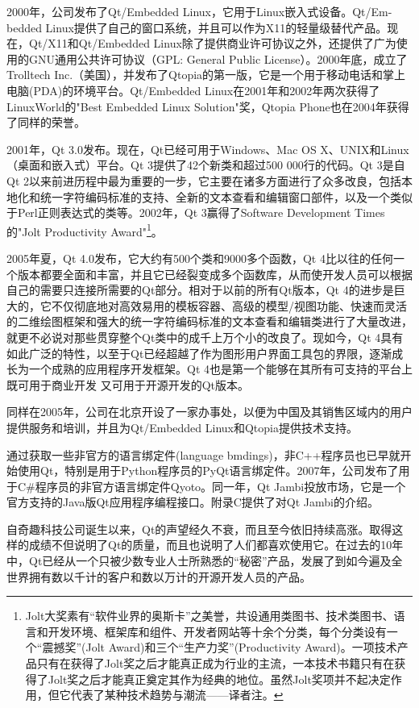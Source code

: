\documentclass[11pt,oneside]{book}
\begin{document}
\begin{common-format}
2000年，公司发布了Qt/Embedded Linux，它用于Linux嵌入式设备。Qt/Em-bedded Linux提供了自己的窗口系统，并且可以作为X11的轻量级替代产品。现在，Qt/X11和Qt/Embedded Linux除了提供商业许可协议之外，还提供了广为使用的GNU通用公共许可协议（GPL: General Public License）。2000年底，成立了Trolltech Inc.（美国），并发布了Qtopia的第一版，它是一个用于移动电话和掌上电脑(PDA)的环境平台。Qt/Embedded Linux在2001年和2002年两次获得了LinuxWorld的"Best Embedded Linux Solution"奖，Qtopia Phone也在2004年获得了同样的荣誉。

2001年，Qt 3.0发布。现在，Qt已经可用于Windows、Mac OS X、UNIX和Linux（桌面和嵌入式）平台。Qt 3提供了42个新类和超过500 000行的代码。Qt 3是自Qt 2以来前进历程中最为重要的一步，它主要在诸多方面进行了众多改良，包括本地化和统一字符编码标准的支持、全新的文本查看和编辑窗口部件，以及一个类似于Perl正则表达式的类等。2002年，Qt 3赢得了Software Development Times的"Jolt Productivity Award"\footnote{Jolt大奖素有“软件业界的奥斯卡”之美誉，共设通用类图书、技术类图书、语言和开发环境、框架库和组件、开发者网站等十余个分类，每个分类设有一个“震撼奖”(Jolt Award)和三个“生产力奖”(Productivity Award)。一项技术产品只有在获得了Jolt奖之后才能真正成为行业的主流，一本技术书籍只有在获得了Jolt奖之后才能真正奠定其作为经典的地位。虽然Jolt奖项并不起决定作用，但它代表了某种技术趋势与潮流——译者注。}。

2005年夏，Qt 4.0发布，它大约有500个类和9000多个函数，Qt 4比以往的任何一个版本都要全面和丰富，并且它已经裂变成多个函数库，从而使开发人员可以根据自己的需要只连接所需要的Qt部分。相对于以前的所有Qt版本，Qt 4的进步是巨大的，它不仅彻底地对高效易用的模板容器、高级的模型/视图功能、快速而灵活的二维绘图框架和强大的统一字符编码标准的文本查看和编辑类进行了大量改进，就更不必说对那些贯穿整个Qt类中的成千上万个小的改良了。现如今，Qt 4具有如此广泛的特性，以至于Qt已经超越了作为图形用户界面工具包的界限，逐渐成长为一个成熟的应用程序开发框架。Qt 4也是第一个能够在其所有可支持的平台上既可用于商业开发
又可用于开源开发的Qt版本。  

同样在2005年，公司在北京开设了一家办事处，以便为中国及其销售区域内的用户提供服务和培训，并且为Qt/Embedded Linux和Qtopia提供技术支持。

通过获取一些非官方的语言绑定件(language bmdings)，非C++程序员也已早就开始使用Qt，特别是用于Python程序员的PyQt语言绑定件。2007年，公司发布了用于C\#{}程序员的非官方语言绑定件Qyoto。同一年，Qt Jambi投放市场，它是一个官方支持的Java版Qt应用程序编程接口。附录C提供了对Qt Jambi的介绍。

自奇趣科技公司诞生以来，Qt的声望经久不衰，而且至今依旧持续高涨。取得这样的成绩不但说明了Qt的质量，而且也说明了人们都喜欢使用它。在过去的10年中，Qt已经从一个只被少数专业人士所熟悉的“秘密”产品，发展了到如今遍及全世界拥有数以千计的客户和数以万计的开源开发人员的产品。



\end{common-format}
\end{document}
